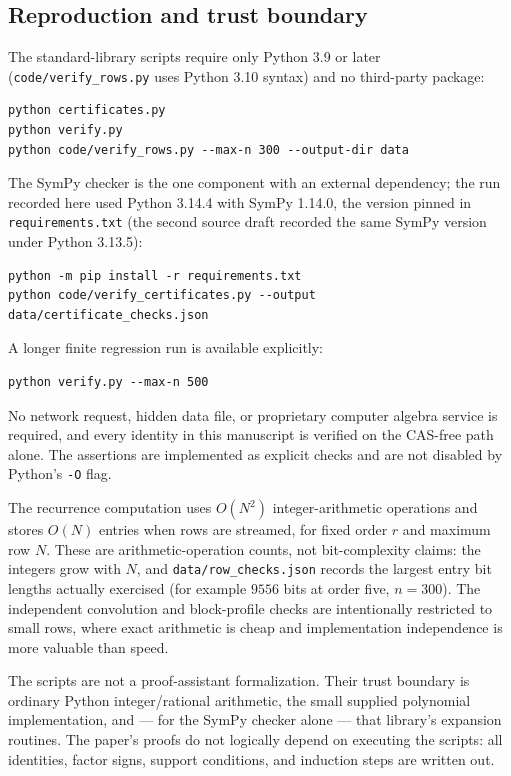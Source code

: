 \documentclass[11pt,a4paper]{article}
\numberwithin{equation}{section}
\theoremstyle{definition}
\theoremstyle{remark}
\begin{document}
\subsection{Reproduction and trust boundary}

The standard-library scripts require only Python 3.9 or later
(\texttt{code/verify\_rows.py} uses Python 3.10 syntax) and no third-party
package:
\begin{lstlisting}
python certificates.py
python verify.py
python code/verify_rows.py --max-n 300 --output-dir data
\end{lstlisting}
The SymPy checker is the one component with an external dependency; the run
recorded here used Python 3.14.4 with SymPy 1.14.0, the version pinned in
\texttt{requirements.txt} (the second source draft recorded the same SymPy
version under Python 3.13.5):
\begin{lstlisting}
python -m pip install -r requirements.txt
python code/verify_certificates.py --output data/certificate_checks.json
\end{lstlisting}
A longer finite regression run is available explicitly:
\begin{lstlisting}
python verify.py --max-n 500
\end{lstlisting}
No network request, hidden data file, or proprietary computer algebra
service is required, and every identity in this manuscript is verified on
the CAS-free path alone. The assertions are implemented as explicit checks
and are not disabled by Python's \texttt{-O} flag.

The recurrence computation uses $O(N^2)$ integer-arithmetic operations and
stores $O(N)$ entries when rows are streamed, for fixed order $r$ and
maximum row $N$. These are arithmetic-operation counts, not bit-complexity
claims: the integers grow with $N$, and \texttt{data/row\_checks.json}
records the largest entry bit lengths actually exercised (for example
$9556$ bits at order five, $n=300$). The independent convolution and
block-profile checks are intentionally restricted to small rows, where
exact arithmetic is cheap and implementation independence is more valuable
than speed.

The scripts are not a proof-assistant formalization. Their trust boundary
is ordinary Python integer/rational arithmetic, the small supplied
polynomial implementation, and --- for the SymPy checker alone --- that
library's expansion routines. The paper's proofs do not logically depend on
executing the scripts: all identities, factor signs, support conditions,
and induction steps are written out.
\end{document}
